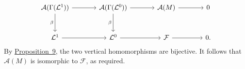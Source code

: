 \label{fac:III:2:no:60:diagram:theorem2}
\[
\begin{tikzcd}[column sep=large,row sep=large]
\mathcal{A}(\Gamma(\mathcal{L}^1))
  \arrow[r] \arrow[d,"\beta"'] &
\mathcal{A}(\Gamma(\mathcal{L}^0))
  \arrow[r] \arrow[d,"\beta"'] &
\mathcal{A}(M) \arrow[r] & 0 \\
\mathcal{L}^1 \arrow[r] &
\mathcal{L}^0 \arrow[r] &
\mathcal{F} \arrow[r] & 0.
\end{tikzcd}
\]
By \hyperref[fac:III:2:no:60:prop:9]{Proposition~9}, the two vertical
homomorphisms are bijective. It follows that $\mathcal{A}(M)$ is
isomorphic to $\mathcal{F}$, as required.
